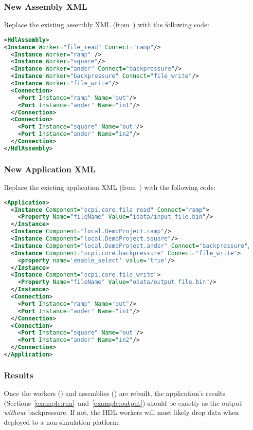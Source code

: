 \subsubsection*{New Assembly XML}
Replace the existing assembly XML (from~) with the following code:
\begin{lstlisting}[language=xml]
<HdlAssembly>
<Instance Worker="file_read" Connect="ramp"/>
  <Instance Worker="ramp" />
  <Instance Worker="square"/>
  <Instance Worker="ander" Connect="backpressure"/>
  <Instance Worker="backpressure" Connect="file_write"/>
  <Instance Worker="file_write"/>
  <Connection>
    <Port Instance="ramp" Name="out"/>
    <Port Instance="ander" Name="in1"/>
  </Connection>
  <Connection>
    <Port Instance="square" Name="out"/>
    <Port Instance="ander" Name="in2"/>
  </Connection>
</HdlAssembly>
\end{lstlisting}
\bend
\bstart
\subsubsection*{New Application XML}
Replace the existing application XML (from~) with the following code:
\begin{lstlisting}[language=xml]
<Application>
  <Instance Component="ocpi.core.file_read" Connect="ramp">
    <Property Name="fileName" Value="idata/input_file.bin"/>
  </Instance>
  <Instance Component="local.DemoProject.ramp"/>
  <Instance Component="local.DemoProject.square"/>
  <Instance Component="local.DemoProject.ander" Connect="backpressure"/>
  <Instance Component="ocpi.core.backpressure" Connect="file_write">
    <property name='enable_select' value='true'/>
  </Instance>
  <Instance Component="ocpi.core.file_write">
    <Property Name="fileName" Value="odata/output_file.bin"/>
  </Instance>
  <Connection>
    <Port Instance="ramp" Name="out"/>
    <Port Instance="ander" Name="in1"/>
  </Connection>
  <Connection>
    <Port Instance="square" Name="out"/>
    <Port Instance="ander" Name="in2"/>
  </Connection>
</Application>
\end{lstlisting}
\bend
\bstart
\subsubsection*{Results}
Once the workers () and assemblies () are rebuilt, the application's results (Sections~\ref{example:run}~and~\ref{example:output}) should be exactly as the output \textit{without} backpressure. If not, the HDL workers will most likely drop data when deployed to a non-simulation platform.
\bend

